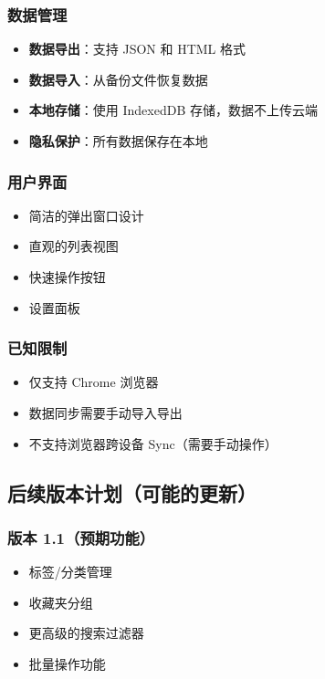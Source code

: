 \documentclass[10pt,a4paper]{article}
\begin{document}
\begin{itemize}
\begin{itemize}
\begin{itemize}
\begin{itemize}
\begin{enumerate}
\begin{itemize}
\subsubsection{数据管理}
\begin{itemize}
  \item \textbf{数据导出}：支持 JSON 和 HTML 格式
  \item \textbf{数据导入}：从备份文件恢复数据
  \item \textbf{本地存储}：使用 IndexedDB 存储，数据不上传云端
  \item \textbf{隐私保护}：所有数据保存在本地
\end{itemize}

\subsubsection{用户界面}
\begin{itemize}
  \item 简洁的弹出窗口设计
  \item 直观的列表视图
  \item 快速操作按钮
  \item 设置面板
\end{itemize}

\subsubsection{已知限制}
\begin{itemize}
  \item 仅支持 Chrome 浏览器
  \item 数据同步需要手动导入导出
  \item 不支持浏览器跨设备 Sync（需要手动操作）
\end{itemize}

\subsection{后续版本计划（可能的更新）}

\subsubsection{版本 1.1（预期功能）}
\begin{itemize}
  \item 标签/分类管理
  \item 收藏夹分组
  \item 更高级的搜索过滤器
  \item 批量操作功能
\end{itemize}


\end{itemize}
\end{enumerate}
\end{itemize}
\end{itemize}
\end{itemize}
\end{itemize}
\end{document}
